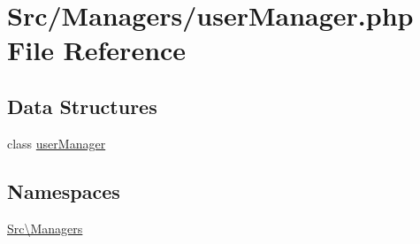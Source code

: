 \hypertarget{user_manager_8php}{}\section{Src/\+Managers/user\+Manager.php File Reference}
\label{user_manager_8php}
\subsection*{Data Structures}
\begin{DoxyCompactItemize}
\item 
class \hyperlink{class_src_1_1_managers_1_1user_manager}{user\+Manager}
\end{DoxyCompactItemize}
\subsection*{Namespaces}
\begin{DoxyCompactItemize}
\item 
 \hyperlink{namespace_src_1_1_managers}{Src\textbackslash{}\+Managers}
\end{DoxyCompactItemize}
